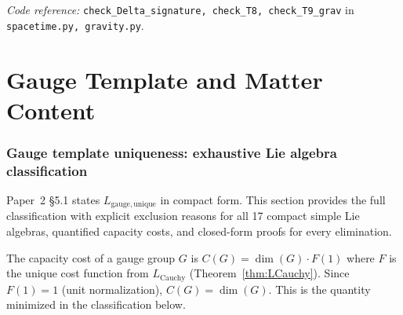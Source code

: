 \documentclass[11pt,a4paper]{article}
\theoremstyle{definition}
\newcommand{\coderef}[2]{\smallskip\noindent\textit{Code reference:} \texttt{#1} in \texttt{#2}.}
\begin{document}
\coderef{check\_Delta\_signature, check\_T8, check\_T9\_grav}{spacetime.py, gravity.py}


\newpage


\part{Gauge Template and Matter Content}
\label{part:gauge}


\section{Gauge template uniqueness: exhaustive Lie algebra classification}
\label{sec:gauge_class_supp}

Paper~2 \S5.1 states $L_{\mathrm{gauge,unique}}$ in compact form.
This section provides the full classification with explicit exclusion
reasons for all 17 compact simple Lie algebras, quantified capacity
costs, and closed-form proofs for every elimination.

The capacity cost of a gauge group $G$ is $C(G) = \dim(G) \cdot F(1)$
where $F$ is the unique cost function from $L_{\mathrm{Cauchy}}$
(Theorem~\ref{thm:LCauchy}).  Since $F(1) = 1$ (unit normalization),
$C(G) = \dim(G)$.  This is the quantity minimized in the classification
below.

%
%
\end{document}
